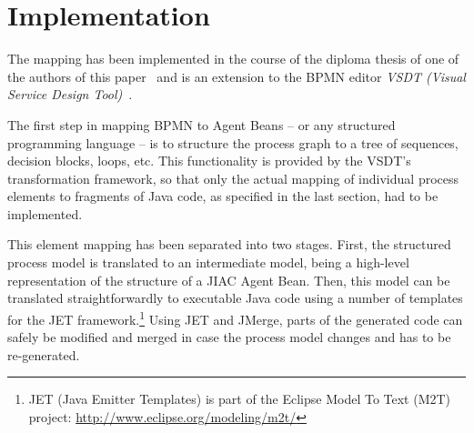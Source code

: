 

\section{Implementation}
\label{sec:impl}

The mapping has been implemented in the course of the diploma thesis of one of
the authors of this paper~\cite{tan2011dipl} and is an extension to the BPMN
editor \emph{VSDT (Visual Service Design Tool)}~\cite{kuester2008vsdt}.

The first step in mapping BPMN to Agent Beans -- or any structured programming
language -- is to structure the process graph to a tree of sequences, decision
blocks, loops, etc.  This functionality is provided by the VSDT's transformation
framework, so that only the actual mapping of individual process elements to
fragments of Java code, as specified in the last section, had to be implemented.

This element mapping has been separated into two stages.  First, the structured
process model is translated to an intermediate model, being a high-level
representation of the structure of a JIAC Agent Bean.  Then, this model can be
translated straightforwardly to executable Java code using a number of templates
for the JET framework.\footnote{JET (Java Emitter Templates) is part of the
Eclipse Model To Text (M2T) project: \url{http://www.eclipse.org/modeling/m2t/}}
Using JET and JMerge, parts of the generated code can safely be modified and
merged in case the process model changes and has to be re-generated.

